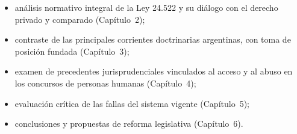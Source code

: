 \documentclass[12pt,oneside]{book}
\begin{document}
\begin{itemize}
    \item análisis normativo integral de la Ley 24.522 y su diálogo con el derecho privado y comparado (Capítulo~2);
    \item contraste de las principales corrientes doctrinarias argentinas, con toma de posición fundada (Capítulo~3);
    \item examen de precedentes jurisprudenciales vinculados al acceso y al abuso en los concursos de personas humanas (Capítulo~4);
    \item evaluación crítica de las fallas del sistema vigente (Capítulo~5);
    \item conclusiones y propuestas de reforma legislativa (Capítulo~6).
\end{itemize}
\end{document}
